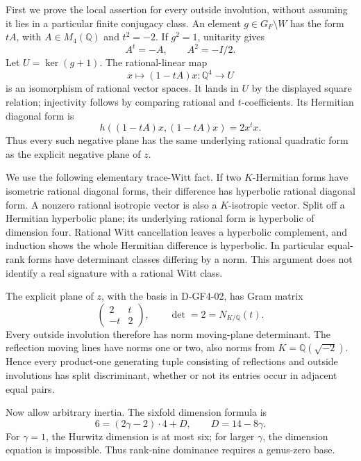 First we prove the local assertion for every outside involution, without
assuming it lies in a particular finite conjugacy class.  An element
\(g\in G_F\setminus W\) has the form \(tA\), with \(A\in M_4(\mathbb Q)\)
and \(t^2=-2\).  If \(g^2=1\), unitarity gives
\[
                       A^t=-A,\qquad A^2=-I/2.
\]
Let \(U=\ker(g+1)\).  The rational-linear map
\[
               x\longmapsto (1-tA)x:\mathbb Q^4\longrightarrow U
\]
is an isomorphism of rational vector spaces.  It lands in \(U\) by the
displayed square relation; injectivity follows by comparing rational and
\(t\)-coefficients.  Its Hermitian diagonal form is
\[
              h((1-tA)x,(1-tA)x)=2x^t x.
\]
Thus every such negative plane has the same underlying rational quadratic
form as the explicit negative plane of \(z\).

We use the following elementary trace-Witt fact.  If two \(K\)-Hermitian
forms have isometric rational diagonal forms, their difference has
hyperbolic rational diagonal form.  A nonzero rational isotropic vector
is also a \(K\)-isotropic vector.  Split off a Hermitian hyperbolic plane;
its underlying rational form is hyperbolic of dimension four.  Rational
Witt cancellation leaves a hyperbolic complement, and induction shows
the whole Hermitian difference is hyperbolic.  In particular equal-rank
forms have determinant classes differing by a norm.  This argument does
not identify a real signature with a rational Witt class.

The explicit plane of \(z\), with the basis in D-GF4-02, has Gram matrix
\[
                         \begin{pmatrix}2&t\\-t&2\end{pmatrix},
                         \qquad\det=2=N_{K/\mathbb Q}(t).
\]
Every outside involution therefore has norm moving-plane determinant.
The reflection moving lines have norms one or two, also norms from
\(K=\mathbb Q(\sqrt{-2})\).  Hence every product-one generating tuple
consisting of reflections and outside involutions has split discriminant,
whether or not its entries occur in adjacent equal pairs.

Now allow arbitrary inertia.  The sixfold dimension formula is
\[
                 6=(2\gamma-2)\cdot4+D,
                 \qquad D=14-8\gamma.
\]
For \(\gamma=1\), the Hurwitz dimension is at most six; for larger
\(\gamma\), the dimension equation is impossible.  Thus rank-nine
dominance requires a genus-zero base.

